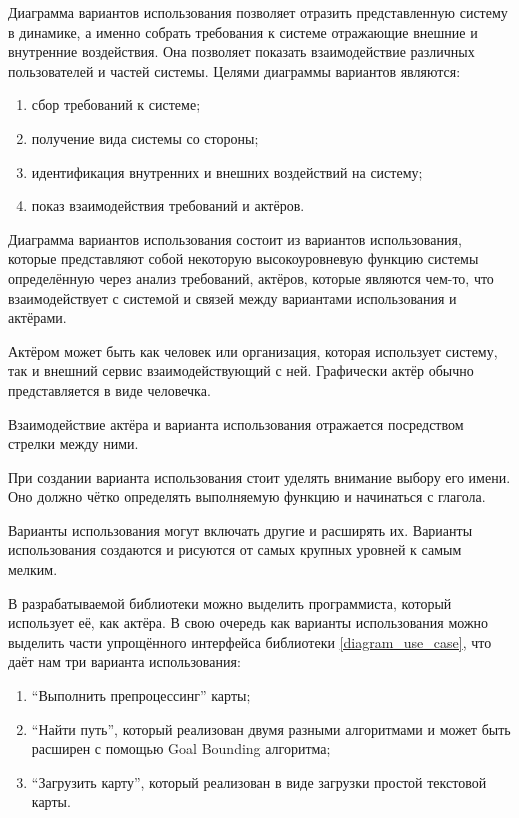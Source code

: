
Диаграмма вариантов использования позволяет отразить представленную систему в динамике, а именно собрать требования к системе отражающие внешние и внутренние воздействия. Она позволяет показать взаимодействие различных пользователей и частей системы. Целями диаграммы вариантов являются:

\begin{enumerate}
	\item сбор требований к системе;
	\item получение вида системы со стороны;
	\item идентификация внутренних и внешних воздействий на систему;
	\item показ взаимодействия требований и актёров.
\end{enumerate}

Диаграмма вариантов использования состоит из вариантов использования, которые представляют собой некоторую высокоуровневую функцию системы определённую через анализ требований, актёров, которые являются чем-то, что взаимодействует с системой и связей между вариантами использования и актёрами.

Актёром может быть как человек или организация, которая использует систему, так и внешний сервис взаимодействующий с ней. Графически актёр обычно представляется в виде человечка.

Взаимодействие актёра и варианта использования отражается посредством стрелки между ними.

При создании варианта использования стоит уделять внимание выбору его имени. Оно должно чётко определять выполняемую функцию и начинаться с глагола. 

Варианты использования могут включать другие и расширять их. Варианты использования создаются и рисуются от самых крупных уровней к самым мелким.


В разрабатываемой библиотеки можно выделить программиста, который использует её, как актёра. В свою очередь как варианты использования можно выделить части упрощённого интерфейса библиотеки \cref{diagram_use_case}, что даёт нам три варианта использования: 

\begin{enumerate}
	\item ``Выполнить препроцессинг'' карты;
	\item ``Найти путь'', который реализован двумя разными алгоритмами и может быть расширен с помощью Goal Bounding алгоритма;
	\item ``Загрузить карту'', который реализован в виде загрузки простой текстовой карты.
\end{enumerate}




